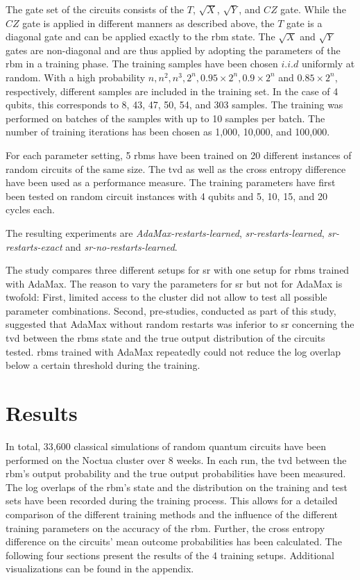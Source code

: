 The gate set of the circuits consists of the $T$, $\sqrt{X}$, $\sqrt{Y}$, and $CZ$ gate. While the $CZ$ gate is 
applied in different manners as described above, the $T$ gate is a diagonal gate and can be applied exactly to the \gls{rbm} state.
The $\sqrt{X}$ and $\sqrt{Y}$ gates are non-diagonal and are thus applied by adopting the parameters of the \gls{rbm} in 
a training phase. The training samples have been chosen $i.i.d$ uniformly at random. 
With a high probability $n, n^2, n^3, 2^n, 0.95 \times 2^n, 0.9 \times 2^n$ and $0.85 \times 2^n$,
respectively, different samples are included in the training set. In the case of 4 qubits, this corresponds to 
8, 43, 47, 50, 54, and 303 samples. The training was performed on batches of the samples with 
up to 10 samples per batch.
The number of training iterations has been chosen as 1,000, 10,000, and 100,000. 

For each parameter setting, 5 \gls{rbm}s have been trained on 20 different instances of random circuits of the same 
size. The \gls{tvd} as well as the cross entropy difference have been used as a performance measure.
The training parameters have first been tested on random circuit instances with 4 qubits and 
5, 10, 15, and 20 cycles each. 

The resulting experiments are \textit{AdaMax-restarts-learned}, \textit{sr-restarts-learned}, 
\textit{sr-restarts-exact} and \textit{sr-no-restarts-learned}. 

The study compares three different setups for \gls{sr} with one setup for \gls{rbm}s trained with 
AdaMax. The reason to vary the parameters for \gls{sr} but not for AdaMax is twofold:
First, limited access to the cluster did not allow to test all possible parameter combinations. Second,
pre-studies, conducted as part of this study, suggested that AdaMax without random restarts 
was inferior to \gls{sr} concerning the \gls{tvd} between the \gls{rbm}s state and the true output distribution of the 
circuits tested. \gls{rbm}s trained with AdaMax repeatedly could not reduce the 
log overlap below a certain threshold during the training.

\section{Results}
\label{sec:results}

In total, 33,600 classical simulations of random quantum circuits have been performed 
on the Noctua cluster over 8 weeks. In each run, the \gls{tvd}
between the \gls{rbm}'s output probability and the true output probabilities have been measured.
 The log overlaps of the \gls{rbm}'s state and the distribution on the training and test sets have been recorded during the training process. This allows for a detailed comparison
of the different training methods and the influence of the different training parameters on the 
accuracy of the \gls{rbm}. Further, the cross entropy difference on the circuits' mean outcome probabilities
has been calculated. The following four sections present the results of the 4 training setups.
Additional visualizations can be found in the appendix.

